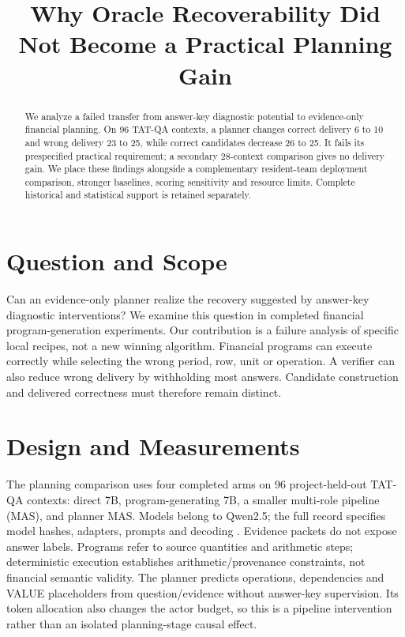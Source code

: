 \documentclass[10pt,twocolumn,letterpaper]{article}
\title{Why Oracle Recoverability Did Not Become a Practical Planning Gain}
\author{}\date{}
\begin{document}
\maketitle
\begin{abstract}We analyze a failed transfer from answer-key diagnostic potential to evidence-only financial planning. On 96 TAT-QA contexts, a planner changes correct delivery 6 to 10 and wrong delivery 23 to 25, while correct candidates decrease 26 to 25. It fails its prespecified practical requirement; a secondary 28-context comparison gives no delivery gain. We place these findings alongside a complementary resident-team deployment comparison, stronger baselines, scoring sensitivity and resource limits. Complete historical and statistical support is retained separately.\end{abstract}

\section{Question and Scope}
Can an evidence-only planner realize the recovery suggested by answer-key diagnostic interventions? We examine this question in completed financial program-generation experiments. Our contribution is a failure analysis of specific local recipes, not a new winning algorithm. Financial programs can execute correctly while selecting the wrong period, row, unit or operation. A verifier can also reduce wrong delivery by withholding most answers. Candidate construction and delivered correctness must therefore remain distinct.

\section{Design and Measurements}
The planning comparison uses four completed arms on 96 project-held-out TAT-QA contexts: direct 7B, program-generating 7B, a smaller multi-role pipeline (MAS), and planner MAS. Models belong to Qwen2.5; the full record specifies model hashes, adapters, prompts and decoding \citep{qwen}. Evidence packets do not expose answer labels. Programs refer to source quantities and arithmetic steps; deterministic execution establishes arithmetic/provenance constraints, not financial semantic validity. The planner predicts operations, dependencies and VALUE placeholders from question/evidence without answer-key supervision. Its token allocation also changes the actor budget, so this is a pipeline intervention rather than an isolated planning-stage causal effect.
\end{document}
